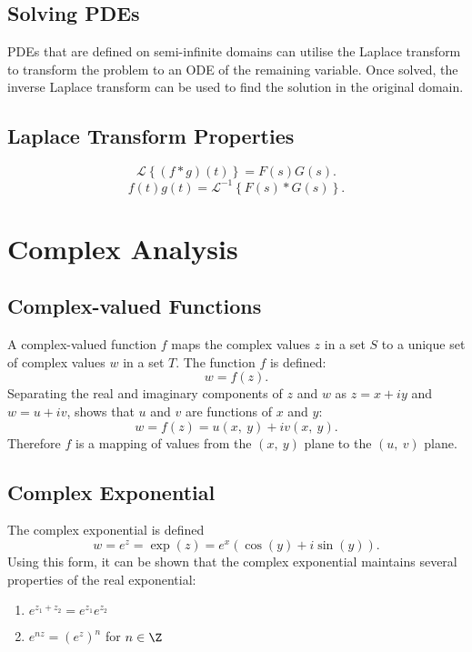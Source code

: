 \documentclass{article}
\begin{document}
\subsection{Solving PDEs}
PDEs that are defined on semi-infinite domains can utilise the Laplace
transform to transform the problem to an ODE of the remaining variable.
Once solved, the inverse Laplace transform can be used to find the
solution in the original domain.
\subsection{Laplace Transform Properties}
\begin{theorem}
    \begin{equation*}
        \mathscr{L}\left\{ \left( f \ast g \right)\left( t \right) \right\} = F\left( s \right) G\left( s \right).
    \end{equation*}
    \begin{equation*}
        f\left( t \right) g\left( t \right) = \mathscr{L}^{-1}\left\{ F\left( s \right) \ast G\left( s \right) \right\}.
    \end{equation*}
\end{theorem}
\section{Complex Analysis}
\subsection{Complex-valued Functions}
A complex-valued function \(f\) maps the complex values \(z\) in a set
\(S\) to a unique set of complex values \(w\) in a set \(T\). The
function \(f\) is defined:
\begin{equation*}
    w = f\left( z \right).
\end{equation*}
Separating the real and imaginary components of \(z\) and \(w\) as
\(z = x + i y\) and \(w = u + i v\), shows that \(u\) and \(v\) are
functions of \(x\) and \(y\):
\begin{equation*}
    w = f\left( z \right) = u\left( x,\: y \right) + i v\left( x,\: y \right).
\end{equation*}
Therefore \(f\) is a mapping of values from the
\(\left( x,\: y \right)\) plane to the \(\left( u,\: v \right)\) plane.
\subsection{Complex Exponential}
The complex exponential is defined
\begin{equation*}
    w = e^z = \exp{\left( z \right)} = e^x \left( \cos{\left( y \right)} + i \sin{\left( y \right)} \right).
\end{equation*}
Using this form, it can be shown that the complex exponential maintains
several properties of the real exponential:
\begin{enumerate}
    \item \(e^{z_1 + z_2} = e^{z_1} e^{z_2}\)
    \item \(e^{n z} = \left( e^z \right)^n\) for \(n \in \Z\)
\end{enumerate}
\end{document}
